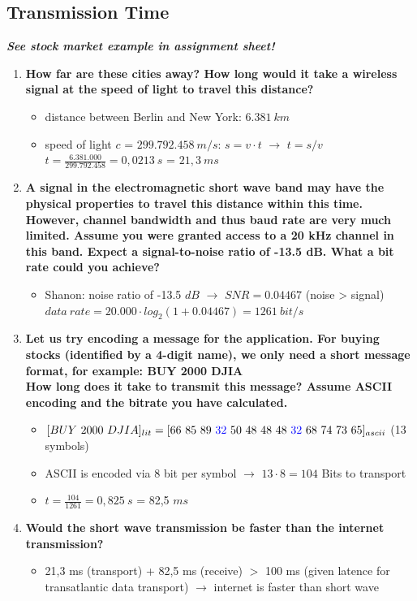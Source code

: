 \documentclass[a4paper,12pt]{article}
\begin{document}
	\subsection{Transmission Time}
	\textbf{\textit{See stock market example in assignment sheet!}}
	\begin{enumerate}[label=(\roman*),itemsep=0pt]
		\item \textbf{How far are these cities away?  How long would it take a wireless signal at the speed of light
			to travel this distance?}
		\begin{itemize}
			\item distance between Berlin and New York: $6.381 ~km$
			\item speed of light $c$ = $299.792.458 ~m/s$: $s = v \cdot t$ $\rightarrow$ $t = s / v $ \\
			$t = \frac{6.381.000}{299.792.458} = 0,0213 ~s$ = $21,3 ~ms$
		\end{itemize}
		\item \textbf{A signal in the electromagnetic short wave band may have the physical properties to travel this distance within this time.  However, channel bandwidth and thus baud rate are very much limited.  Assume you were granted access to a 20 kHz channel in this band. Expect a signal-to-noise ratio of -13.5 dB. What a bit rate could you achieve?}
		\begin{itemize}
			\item Shanon: noise ratio of -13.5 $dB$ $\rightarrow$ $SNR = 0.04467$ (noise > signal)\\
			$data~rate = 20.000 \cdot log_2( 1+ 0.04467) = 1261 ~bit/s$
		\end{itemize}
		\item \textbf{Let us try encoding a message for the application. For buying stocks (identified by a 4-digit name), we only need a short message format, for example:  {\large BUY 2000 DJIA}\\
		How long does it take to transmit this message? Assume ASCII encoding and the bitrate you have calculated.}
		\begin{itemize}
			\item $[BUY~2000~DJIA]_{lit} = [66~85~89~\textcolor{blue}{32}~50~48~48~48~\textcolor{blue}{32}~68~74~73~65]_{ascii}$ (13 symbols)
			\item ASCII is encoded via 8 bit per symbol $\rightarrow$ $13 \cdot 8 = 104$ Bits to transport
			\item $t = \frac{104}{1261} = 0,825~s$ = 82,5 $ms$
		\end{itemize}
		\item \textbf{Would the short wave transmission be faster than the internet transmission?}
		\begin{itemize}
			\item 21,3 ms (transport) + 82,5 ms (receive)  $>$ 100 ms (given latence for transatlantic data transport) $\rightarrow$ internet is faster than short wave
		\end{itemize}
	\end{enumerate}
	
	
	
\end{document}

